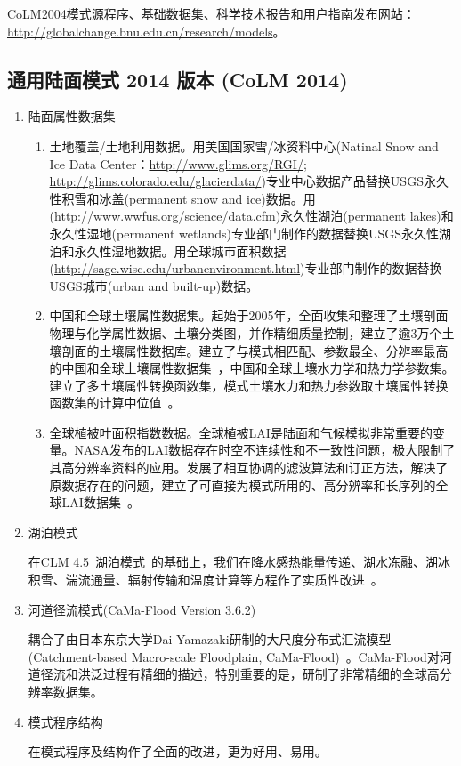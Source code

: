 CoLM2004模式源程序、基础数据集、科学技术报告和用户指南发布网站： \url{http://globalchange.bnu.edu.cn/research/models}。


\subsection{通用陆面模式 2014 版本 (CoLM 2014)}
\begin{enumerate}[label={\arabic*)}]
    \item 陆面属性数据集
    \begin{enumerate}[label={\alph*)}]
    \item 土地覆盖/土地利用数据。用美国国家雪/冰资料中心(Natinal Snow and Ice Data Center：\url{http://www.glims.org/RGI/}; \url{http://glims.colorado.edu/glacierdata/})专业中心数据产品替换USGS永久性积雪和冰盖(permanent snow and ice)数据。用(\url{http://www.wwfus.org/science/data.cfm})永久性湖泊(permanent lakes)和永久性湿地(permanent wetlands)专业部门制作的数据替换USGS永久性湖泊和永久性湿地数据。用全球城市面积数据(\url{http://sage.wisc.edu/urbanenvironment.html})专业部门制作的数据替换USGS城市(urban and built-up)数据。
    \item 中国和全球土壤属性数据集。起始于2005年，全面收集和整理了土壤剖面物理与化学属性数据、土壤分类图，并作精细质量控制，建立了逾3万个土壤剖面的土壤属性数据库。建立了与模式相匹配、参数最全、分辨率最高的中国和全球土壤属性数据集~\citep{shangguan2013china,shangguan2014global}，中国和全球土壤水力学和热力学参数集。建立了多土壤属性转换函数集，模式土壤水力和热力参数取土壤属性转换函数集的计算中位值~\citep{dai2013development}。
    \item 全球植被叶面积指数数据。全球植被LAI是陆面和气候模拟非常重要的变量。NASA发布的LAI数据存在时空不连续性和不一致性问题，极大限制了其高分辨率资料的应用。发展了相互协调的滤波算法和订正方法，解决了原数据存在的问题，建立了可直接为模式所用的、高分辨率和长序列的全球LAI数据集~\citep{yuan2011reprocessing}。
    \end{enumerate}
    \item 湖泊模式

    在CLM 4.5~\citep{oleson2013technical}湖泊模式~\citep{subin2012improved}的基础上，我们在降水感热能量传递、湖水冻融、湖冰积雪、湍流通量、辐射传输和温度计算等方程作了实质性改进~\citep{戴永久2018通用陆面模式}。
    
    \item 河道径流模式(CaMa-Flood Version 3.6.2)

    耦合了由日本东京大学Dai Yamazaki研制的大尺度分布式汇流模型  (Catchment-based Macro-scale Floodplain, CaMa-Flood)~\citep{yamazaki2011physically}。CaMa-Flood对河道径流和洪泛过程有精细的描述，特别重要的是，研制了非常精细的全球高分辨率数据集。

    \item 模式程序结构

    在模式程序及结构作了全面的改进，更为好用、易用。
\end{enumerate}

